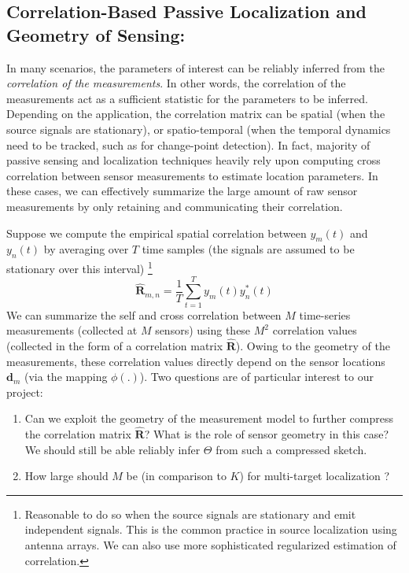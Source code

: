 \subsection{Correlation-Based Passive Localization and Geometry of Sensing:} In many scenarios, the parameters of interest can be reliably inferred from the {\em correlation of the measurements}. In other words, the correlation of the measurements act as a sufficient statistic for the parameters to be inferred. Depending on the application, the correlation matrix can be spatial (when the source signals are stationary), or spatio-temporal (when the temporal dynamics need to be tracked, such as for change-point detection). In fact, majority of passive sensing and localization techniques heavily rely upon computing cross correlation between sensor measurements to estimate location parameters. In these cases, we can effectively summarize the large amount of raw sensor measurements by only retaining and communicating their correlation. 

 Suppose we compute the empirical spatial correlation between $y_m(t)$ and $y_n(t)$  by averaging over $T$ time samples (the signals are assumed to be stationary over this interval) \footnote{Reasonable to do so when the source signals are stationary and emit independent signals. This is the common practice in source localization using antenna arrays. We can also use more sophisticated regularized estimation of correlation.}
\begin{equation}
\mathbf{\hat{R}}_{m,n} = \frac{1}{T}\sum_{t=1}^{T} y_m (t) y^*_n (t) 
\end{equation} 
We can summarize the self and cross correlation between $M$ time-series measurements (collected at $M$ sensors) using these $M^2$ correlation values (collected in the form of a correlation matrix $\mathbf{\hat{R}}$). Owing to the geometry of the measurements, these correlation values directly depend on the sensor locations $\mathbf{d}_m$  (via the mapping $\phi(.)$). Two questions are of particular interest to our project:
\begin{enumerate}
\item Can we exploit the geometry of the measurement model to further compress the  correlation matrix $\mathbf{\hat{R}}$? What is the role of sensor geometry in this case? We should still be able reliably infer $\Theta$ from such a compressed sketch.
\item How large should $M$ be (in comparison to $K$) for multi-target localization ?
\end{enumerate}


